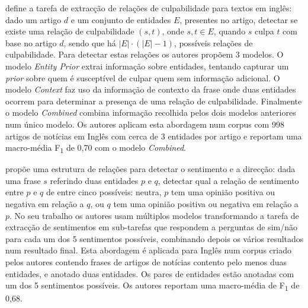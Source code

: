 \documentclass[a4paper, twocolumn, 11pt, twoside]{article}
\begin{document}
\cite{liang2019blames} define a tarefa de extracção de relações de culpabilidade para textos em inglês: dado um artigo $d$ e um conjunto de entidades $E$, presentes no artigo, detectar se existe uma relação de culpabilidade $(s,t)$, onde $s,t \in E$, quando $s$ culpa $t$ com base no artigo $d$, sendo que há $\lvert{E}\rvert \cdot (\lvert{E}\rvert - 1)$, possíveis relações de culpabilidade. Para detectar estas relações os autores propõem 3 modelos. O modelo \textit{Entity Prior} extrai informação sobre entidades, tentando capturar um \textit{prior} sobre quem é susceptível de culpar quem sem informação adicional. O modelo \textit{Context} faz uso da informação de contexto da frase onde duas entidades ocorrem para determinar a presença de uma relação de culpabilidade. Finalmente o modelo \textit{Combined} combina informação recolhida pelos dois modelos anteriores num único modelo. Os autores aplicam esta abordagem num corpus com 998 artigos de notícias em Inglês com cerca de 3 entidades por artigo e reportam uma macro-média F\textsubscript{1} de 0,70 com o modelo \textit{Combined}.

\cite{park-etal-2021-blames} propõe uma estrutura de relações para detectar o sentimento e a direcção: dada uma frase $s$ referindo duas entidades $p$ e $q$, detectar qual a relação de sentimento entre $p$ e $q$ de entre cinco possíveis: neutra, $p$ tem uma opinião positiva ou negativa em relação a $q$, ou $q$ tem uma opinião positiva ou negativa em relação a $p$. No seu trabalho os autores usam múltiplos modelos transformando a tarefa de extracção de sentimentos em sub-tarefas que respondem a perguntas de sim/não para cada um dos 5 sentimentos possíveis, combinando depois os vários resultados num resultado final. Esta abordagem é aplicada para Inglês num corpus criado pelos autores contendo frases de artigos de notícias contento pelo menos duas entidades, e anotado duas entidades. Os pares de entidades estão anotadas com um dos 5 sentimentos possíveis. Os autores reportam uma macro-média de F\textsubscript{1} de 0,68.
\end{document}

